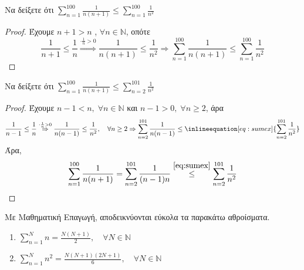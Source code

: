 \documentclass[main.tex]{subfiles}
\begin{document}

\begin{example}
  Να δείξετε ότι $ \sum_{n=1}^{100} \frac{1}{n(n+1)} \leq \sum_{n=1}^{100} 
  \frac{1}{n^{2}} $
\end{example}
\begin{proof}
\item {} 
  Έχουμε $ n+1 > n $ , $ \forall n \in \mathbb{N} $, οπότε
  \[
    \frac{1}{n+1} \leq \frac{1}{n} \overset{\cdot \frac{1}{n} >0}{\Rightarrow}
    \frac{1}{n(n+1)} \leq \frac{1}{n^{2}} \Rightarrow \sum_{n=1}^{100} 
    \frac{1}{n(n+1)} \leq \sum_{n=1}^{100} \frac{1}{n^{2}} 
  \] 
\end{proof}

\begin{exercise}
  Να δείξετε ότι $ \sum_{n=1}^{100} \frac{1}{n(n+1)} \leq \sum_{n=2}^{101} 
  \frac{1}{n^{2}} $
\end{exercise} 
\begin{proof}
\item {} 
  Έχουμε $ n-1 < n, \; \forall n \in \mathbb{N} $ και 
  $ n-1>0, \; \forall n \geq 2 $, άρα
  \[
    \frac{1}{n-1} \leq \frac{1}{n} \overset{\cdot \frac{1}{n} >0}{\Rightarrow}
    \frac{1}{n(n-1)} \leq \frac{1}{n^{2}}, \quad \forall n \geq 2 \Rightarrow 
    \sum_{n=2}^{101} \frac{1}{n(n-1)} \leq 
    \inlineequation[eq:sumex]{\sum_{n=2}^{101} \frac{1}{n^{2}}}
  \] 
  Άρα, 
  \[
    \sum_{n=1}^{100} \frac{1}{n(n+1)} = \sum_{n=2}^{101} \frac{1}{(n-1)n} 
    \overset{\eqref{eq:sumex}}{\leq} \sum_{n=2}^{101} \frac{1}{n^{2}} 
  \]
\end{proof}

\begin{example}
  Με Μαθηματική Επαγωγή, αποδεικνύονται εύκολα τα παρακάτω αθροίσματα.
  \begin{enumerate}[wide,labelindent=0pt]
    \item $ \sum_{n=1}^{N} n = \frac{N(N+1)}{2}, \quad \forall N \in \mathbb{N}  $
    \item $ \sum_{n=1}^{N} n^{2} = \frac{N(N+1)(2N+1)}{6}, \quad \forall N \in 
      \mathbb{N} $
  \end{enumerate}
\end{example}
\end{document}
